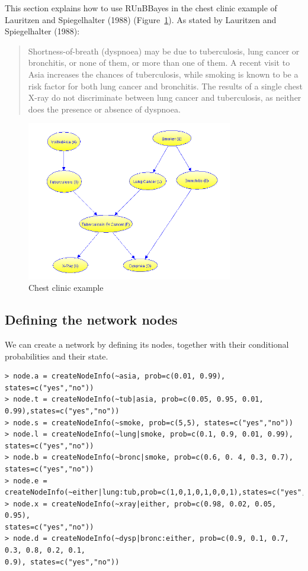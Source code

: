 \documentclass{article}
\begin{document}
This section explains how to use RUnBBayes in the chest clinic example of Lauritzen and Spiegelhalter (1988) (Figure~\ref{fig:asia}). As stated by Lauritzen and Spiegelhalter (1988):

\begin{quotation}
Shortness-of-breath (dyspnoea) may be due to tuberculosis, lung cancer or bronchitis, or none of them, or more than one of them. A recent visit to Asia increases the chances of tuberculosis, while smoking is known to be a risk factor for both lung cancer and bronchitis. The results of a single chest X-ray do not discriminate between lung cancer and tuberculosis, as neither does the presence or absence of dyspnoea.
\end{quotation}

\begin{figure}[ht!]
\centering
\includegraphics[width=90mm]{chest-clinic.png}
\caption{Chest clinic example}
\label{fig:asia}
\end{figure}


\subsection{Defining the network nodes}

We can create a network by defining its nodes, together with their conditional probabilities and their state. 

\begin{verbatim}
> node.a = createNodeInfo(~asia, prob=c(0.01, 0.99), states=c("yes","no"))
> node.t = createNodeInfo(~tub|asia, prob=c(0.05, 0.95, 0.01, 0.99),states=c("yes","no"))
> node.s = createNodeInfo(~smoke, prob=c(5,5), states=c("yes","no"))
> node.l = createNodeInfo(~lung|smoke, prob=c(0.1, 0.9, 0.01, 0.99), states=c("yes","no"))
> node.b = createNodeInfo(~bronc|smoke, prob=c(0.6, 0. 4, 0.3, 0.7), states=c("yes","no"))
> node.e = createNodeInfo(~either|lung:tub,prob=c(1,0,1,0,1,0,0,1),states=c("yes","no"))
> node.x = createNodeInfo(~xray|either, prob=c(0.98, 0.02, 0.05, 0.95), 
states=c("yes","no"))
> node.d = createNodeInfo(~dysp|bronc:either, prob=c(0.9, 0.1, 0.7, 0.3, 0.8, 0.2, 0.1, 
0.9), states=c("yes","no"))
\end{verbatim}
\end{document}
